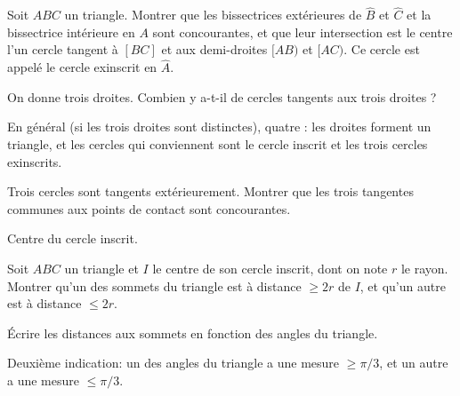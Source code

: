 \begin{exo}
Soit $ABC$ un triangle. Montrer que les bissectrices extérieures de $\widehat B$ et $\widehat C$ et la bissectrice intérieure en $A$ sont concourantes, et que leur intersection est le centre l'un cercle tangent à $[BC]$ et aux demi-droites $[AB)$ et $[AC)$. Ce cercle est appelé le cercle exinscrit en $\widehat{A}$.
\end{exo}

\begin{exo}
On donne trois droites. Combien y a-t-il de cercles tangents aux trois droites ?
\begin{sol}
En général (si les trois droites sont distinctes), quatre : les droites forment un triangle, et les cercles qui conviennent sont le cercle inscrit et les trois cercles exinscrits.
\end{sol}
\end{exo}

\begin{exo}
Trois cercles sont tangents extérieurement. Montrer que les trois tangentes communes aux points de contact sont concourantes.
\begin{hint}
Centre du cercle inscrit.
\end{hint}
\end{exo}


\begin{exo} %
Soit $ABC$ un triangle et $I$ le centre de son cercle inscrit, dont on note $r$ le rayon. Montrer qu'un des sommets du triangle est à distance $\geq 2r$ de $I$, et qu'un autre est à distance $\leq 2r$.

\begin{hint}   
\'Ecrire les distances aux sommets en fonction des angles du triangle.
\end{hint}      
\begin{sol} 
Deuxième indication: un des angles du triangle a une mesure $\geq \pi/3$, et un autre a une mesure $\leq \pi/3$.
\end{sol}  

\end{exo}  



